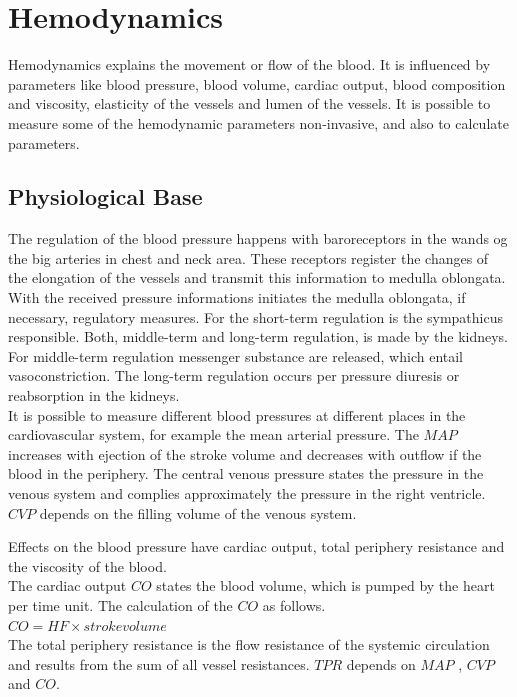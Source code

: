 \chapter{Hemodynamics}
Hemodynamics explains the movement or flow of the blood. It is influenced by parameters like blood pressure, blood volume, cardiac output, blood composition and viscosity, elasticity of the vessels and lumen of the vessels. It is possible to measure some of the hemodynamic parameters non-invasive, and also to calculate parameters.

\section{Physiological Base}
The regulation of the blood pressure happens with baroreceptors in the wands og the big arteries in chest and neck area. These receptors register the changes of the elongation of the vessels and transmit this information to medulla oblongata. With the received pressure informations  initiates the medulla oblongata, if necessary, regulatory measures. For the short-term regulation is the sympathicus responsible. Both, middle-term and long-term regulation, is made by the kidneys. For middle-term regulation messenger substance are released, which entail vasoconstriction. The long-term regulation occurs  per pressure diuresis or reabsorption in the kidneys.\\

It is possible to measure different blood pressures at different places in the cardiovascular system, for example the mean arterial pressure. The $ MAP $ increases with ejection of the stroke volume and decreases with outflow if the blood in the periphery. The central venous pressure states the pressure in the venous system and complies approximately the pressure in the right ventricle. $ CVP $ depends on the filling volume of the venous system.

Effects on the blood pressure have cardiac output, total periphery resistance and the viscosity of the blood.\\

The cardiac output $ CO $ states the blood volume, which is pumped by the heart per time unit. The calculation of the $ CO $ as follows.\\

$ CO=HF\times stroke volume $\\

The total periphery resistance is the flow resistance of the systemic circulation and results from the sum of all vessel resistances. $ TPR $ depends on $ MAP $ , $ CVP $ and $ CO $.\\

